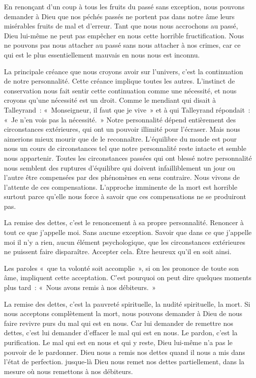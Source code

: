 \documentclass[french,twoside]{book} %
\begin{document}
En renonçant d'un coup à tous les fruits du passé sans exception, nous pouvons demander à Dieu que nos péchés passés ne portent pas dans notre âme leurs misérables fruits de mal et d'erreur. Tant que nous nous accrochons au passé, Dieu lui-même ne peut pas empêcher en nous cette horrible fructification. Nous ne pouvons pas nous attacher au passé sans nous attacher à nos crimes, car ce qui est le plus essentiellement mauvais en nous nous est inconnu.\par
La principale créance que nous croyons avoir sur l'univers, c'est la continuation de notre personnalité. Cette créance implique toutes les autres. L'instinct de conservation nous fait sentir cette continuation comme une nécessité, et nous croyons qu'une nécessité est un droit. Comme le mendiant qui disait à Talleyrand : « Monseigneur, il faut que je vive » et à qui Talleyrand répondait : « Je n'en vois pas la nécessité. » Notre personnalité dépend entièrement des circonstances extérieures, qui ont un pouvoir illimité pour l'écraser. Mais nous aimerions mieux mourir que de le reconnaître. L'équilibre du monde est pour nous un cours de circonstances tel que notre personnalité reste intacte et semble nous appartenir. Toutes les circonstances passées qui ont blessé notre personnalité nous semblent des ruptures d'équilibre qui doivent infailliblement un jour ou l'autre être compensées par des phénomènes en sens contraire. Nous vivons de l'attente de ces compensations. L'approche imminente de la mort est horrible surtout parce qu'elle nous force à savoir que ces compensations ne se produiront pas.\par
La remise des dettes, c'est le renoncement à sa propre personnalité. Renoncer à tout ce que j'appelle moi. Sans aucune exception. Savoir que dans ce que j'appelle moi il n'y a rien, aucun élément psychologique, que les circonstances extérieures ne puissent faire disparaître. Accepter cela. Être heureux qu'il en soit ainsi.\par
Les paroles « que ta volonté soit accomplie », si on les prononce de toute son âme, impliquent cette acceptation. C'est pourquoi on peut dire quelques moments plus tard : « Nous avons remis à nos débiteurs. »\par
La remise des dettes, c'est la pauvreté spirituelle, la nudité spirituelle, la mort. Si nous acceptons complètement la mort, nous pouvons demander à Dieu de nous faire revivre purs du mal qui est en nous. Car lui demander de remettre nos dettes, c'est lui demander d'effacer le mal qui est en nous. Le pardon, c'est la purification. Le mal qui est en nous et qui y reste, Dieu lui-même n'a pas le pouvoir de le pardonner. Dieu nous a remis nos dettes quand il nous a mis dans l'état de perfection. jusque-là Dieu nous remet nos dettes partiellement, dans la mesure où nous remettons à nos débiteurs.\par
\end{document}
